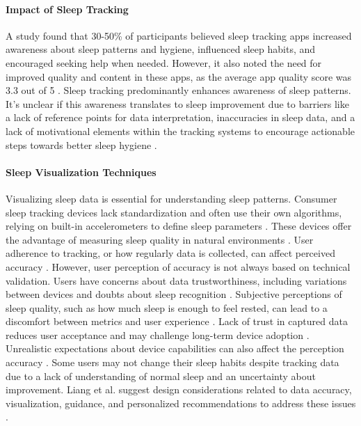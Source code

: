 \documentclass[
  a4paper,  %
  twoside,  %
  bibliography=totoc,
  headsepline,
  cleardoublepage=empty,
  parskip=half,
  draft=false
]{scrbook}
\begin{document}
\paragraph{Impact of Sleep Tracking}
A study found that 30-50\% of participants believed sleep tracking apps increased awareness about sleep patterns and hygiene, influenced sleep  habits, and encouraged seeking help when needed. However, it also noted the need for improved quality and content in these apps, as the average app quality score was 3.3 out of 5 \cite{karasneh_smartphone_2022}. Sleep tracking predominantly enhances awareness of sleep patterns. It's unclear if this awareness translates to sleep improvement due to barriers like a lack of reference points for data interpretation, inaccuracies in sleep data, and a lack of motivational elements within the tracking systems to encourage actionable steps towards better sleep hygiene \cite{SleepTracking_in_the_real_world}.

\paragraph{Sleep Visualization Techniques}
Visualizing sleep data is essential for understanding sleep patterns. Consumer sleep tracking devices lack standardization and often use their own algorithms, relying on built-in accelerometers to define sleep parameters \cite{SleepTracking_ClnicalCare, lee_consumer_review2015}. These devices offer the advantage of measuring sleep quality in natural environments \cite{Making_sense_of_sensors}. User adherence to tracking, or how regularly data is collected, can affect perceived accuracy \cite{Defining_Adherence}. However, user perception of accuracy is not always based on technical validation.
Users have concerns about data trustworthiness, including variations between devices and doubts about sleep recognition \cite{Challenges_Oppotunieties_SleepTracking}. Subjective perceptions of sleep quality, such as how much sleep is enough to feel rested, can lead to a discomfort between metrics and user experience \cite{sleepexplorer}. Lack of trust in captured data reduces user acceptance \cite{Trust_activity_tracker} and may challenge long-term device adoption \cite{sleepexplorer}. Unrealistic expectations about device capabilities can also affect the perception accuracy \cite{Use_and_Adoption}.
Some users may not change their sleep habits despite tracking data due to a lack of understanding of normal sleep and an uncertainty about improvement. Liang et al. suggest design considerations related to data accuracy, visualization, guidance, and personalized recommendations to address these issues \cite{SleepTracking_in_the_real_world}.
\end{document}
